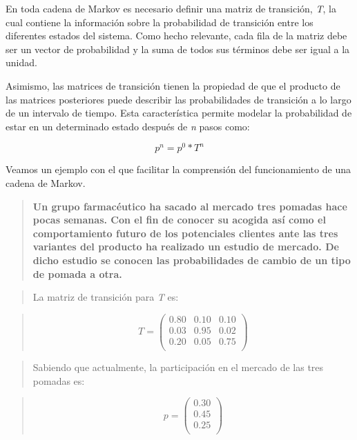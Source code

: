 \documentclass[
  a4paper,
  DIV=11,
  numbers=noendperiod]{scrreprt}
\begin{document}
En toda cadena de Markov es necesario definir una matriz de transición,
\emph{T}, la cual contiene la información sobre la probabilidad de
transición entre los diferentes estados del sistema. Como hecho
relevante, cada fila de la matriz debe ser un vector de probabilidad y
la suma de todos sus términos debe ser igual a la unidad.

Asimismo, las matrices de transición tienen la propiedad de que el
producto de las matrices posteriores puede describir las probabilidades
de transición a lo largo de un intervalo de tiempo. Esta característica
permite modelar la probabilidad de estar en un determinado estado
después de \emph{n} pasos como:

\[p^n= p^0* T^n\]

Veamos un ejemplo con el que facilitar la comprensión del funcionamiento
de una cadena de Markov.

\begin{quote}
\textbf{Un grupo farmacéutico ha sacado al mercado tres pomadas hace
pocas semanas. Con el fin de conocer su acogida así como el
comportamiento futuro de los potenciales clientes ante las tres
variantes del producto ha realizado un estudio de mercado. De dicho
estudio se conocen las probabilidades de cambio de un tipo de pomada a
otra.}
\end{quote}

\begin{quote}
La matriz de transición para \emph{T} es:
\end{quote}

\begin{quote}
\[
T = \begin{pmatrix}
0.80 & 0.10 & 0.10 \\
0.03 & 0.95 & 0.02 \\
0.20 & 0.05 & 0.75 \\
\end{pmatrix}
\]
\end{quote}

\begin{quote}
Sabiendo que actualmente, la participación en el mercado de las tres
pomadas es:
\end{quote}

\begin{quote}
\[
p = \begin{pmatrix}
0.30 \\
0.45 \\
0.25 \\
\end{pmatrix}
\]
\end{quote}
\end{document}
